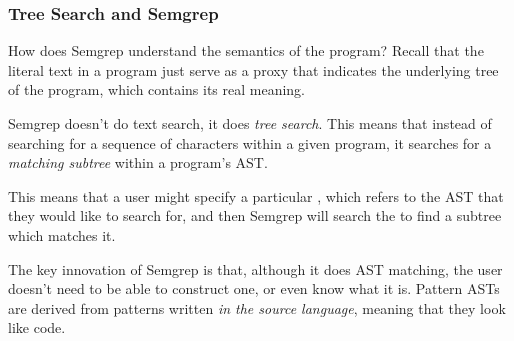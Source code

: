 \documentclass[aspectratio=169, handout]{beamer}
\begin{document}
 \begin{frame}[fragile]
   \frametitle{Tree Search and Semgrep}

   How does Semgrep understand the semantics of the program? Recall that
   the literal text in a program just serve as a proxy that indicates the underlying
   tree of the program, which contains its real meaning.

   \pause
   \vspace{\fill}

   Semgrep doesn't do text search, it does \textit{tree search}. This means that
   instead of searching for a sequence of characters within a given program, it
   searches for a \textit{matching subtree} within a program's AST.

   \pause
   \vspace{\fill}

   This means that a user might specify a particular , which refers
   to the AST that they would like to search for, and then Semgrep will search the
    to find a subtree which matches it.

   \pause
   \vspace{\fill}

   The key innovation of Semgrep is that, although it does AST matching, the user
   doesn't need to be able to construct one, or even know what it is. Pattern ASTs
   are derived from patterns written \textit{in the source language}, meaning
   that they look like code.
 \end{frame}
\end{document}

